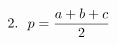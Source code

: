 \documentclass[preview]{standalone}
\begin{document}
\begin{align*}
\special{dvisvgm:raw <g id='unique000'>}2.\ \ p = \dfrac{a+b+c}{2}\special{dvisvgm:raw </g>}
\end{align*}
\end{document}
